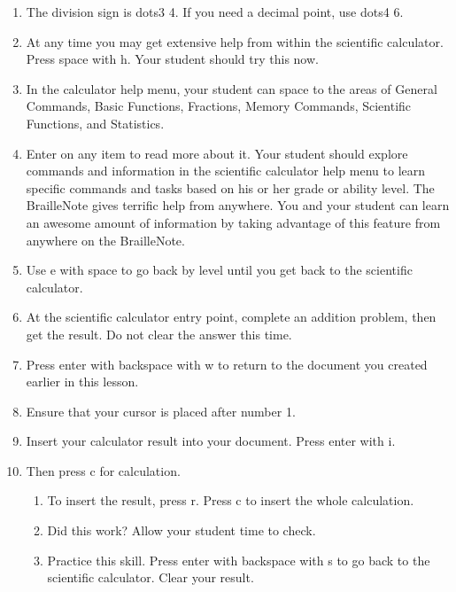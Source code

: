 \documentclass[10pt,letterpaper,twoside]{report}
\begin{document}
{{{{\begin{enumerate}
	\item The division sign is dots3 4.  If you need a decimal point, use dots4 6.
	      
	\item At any time you may get extensive help from within the scientific calculator.  Press space with h.  Your student should try this now.
	      
	\item In the calculator help menu, your student can space to the areas of General Commands, Basic Functions, Fractions, Memory Commands, Scientific Functions, and Statistics.
	      
	\item Enter on any item to read more about it.  Your student should explore commands and information in the scientific calculator help menu to learn specific commands and tasks based on his or her grade or ability level. The BrailleNote gives terrific help from anywhere.  You and your student can learn an awesome amount of information by taking advantage of this feature from anywhere on the BrailleNote.
	      
	\item Use e with space to go back by level until you get back to the scientific calculator.
	      
	\item At the scientific calculator entry point, complete an addition problem, then get the result.  Do not clear the answer this time.
	      
	\item Press enter with backspace with w to return to the document you created earlier in this lesson.
	      
	\item Ensure that your cursor is placed after number 1.
	      
	\item Insert your calculator result into your document.  Press enter with i.
	      
	\item Then press c for calculation.
	      
	      \begin{enumerate}
		      \item To insert the result, press r.  Press c to insert the whole calculation.
		            
		      \item Did this work? Allow your student time to check.
		            
		      \item Practice this skill.  Press enter with backspace with s to go back to the scientific calculator.  Clear your result.
		            

\end{enumerate}
\end{enumerate}}}}}
\end{document}
